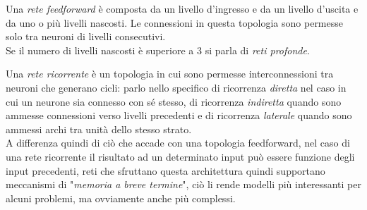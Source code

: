 \documentclass[../../main.tex]{subfiles}
\begin{document}
Una \textit{rete feedforward} è composta da un livello d'ingresso e da un livello d'uscita e da uno o più livelli nascosti. Le connessioni in questa topologia sono permesse solo tra neuroni di livelli consecutivi.\\
Se il numero di livelli nascosti è superiore a 3 si parla di \textit{reti profonde}.

Una \textit{rete ricorrente} è un topologia in cui sono permesse interconnessioni tra neuroni che generano cicli: parlo nello specifico di ricorrenza \textit{diretta} nel caso in cui un neurone sia connesso con sé stesso, di ricorrenza \textit{indiretta} quando sono ammesse connessioni verso livelli precedenti e di ricorrenza \textit{laterale} quando sono ammessi archi tra unità dello stesso strato.\\
A differenza quindi di ciò che accade con una topologia feedforward, nel caso di una rete ricorrente il risultato ad un determinato input può essere funzione degli input precedenti, reti che sfruttano questa architettura quindi supportano meccanismi di "\textit{memoria a breve termine}", ciò li rende modelli più interessanti per alcuni problemi, ma ovviamente anche più complessi.
\end{document}
